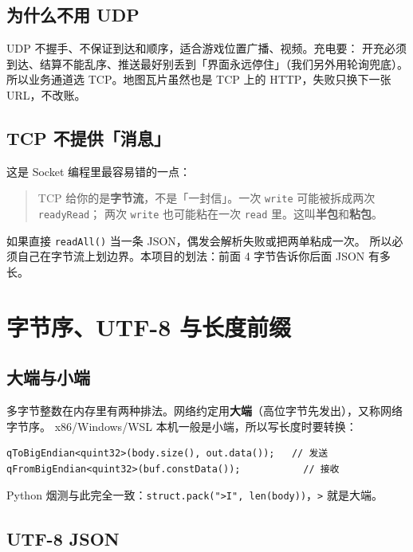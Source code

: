 \documentclass[UTF8,a4paper,11pt]{ctexart}
\begin{document}
\subsection{为什么不用 UDP}

UDP 不握手、不保证到达和顺序，适合游戏位置广播、视频。充电要：
开充必须到达、结算不能乱序、推送最好别丢到「界面永远停住」（我们另外用轮询兜底）。
所以业务通道选 TCP。地图瓦片虽然也是 TCP 上的 HTTP，失败只换下一张 URL，不改账。

\subsection{TCP 不提供「消息」}

这是 Socket 编程里最容易错的一点：

\begin{quote}
TCP 给你的是\textbf{字节流}，不是「一封信」。一次 \texttt{write} 可能被拆成两次 \texttt{readyRead}；
两次 \texttt{write} 也可能粘在一次 \texttt{read} 里。这叫\textbf{半包}和\textbf{粘包}。
\end{quote}

如果直接 \texttt{readAll()} 当一条 JSON，偶发会解析失败或把两单粘成一次。
所以必须自己在字节流上划边界。本项目的划法：前面 4 字节告诉你后面 JSON 有多长。

\section{字节序、UTF-8 与长度前缀}

\subsection{大端与小端}

多字节整数在内存里有两种排法。网络约定用\textbf{大端}（高位字节先发出），又称网络字节序。
x86/Windows/WSL 本机一般是小端，所以写长度时要转换：

\begin{lstlisting}
qToBigEndian<quint32>(body.size(), out.data());   // 发送
qFromBigEndian<quint32>(buf.constData());           // 接收
\end{lstlisting}

Python 烟测与此完全一致：\texttt{struct.pack(">I", len(body))}，\texttt{>} 就是大端。

\subsection{UTF-8 JSON}
\end{document}
